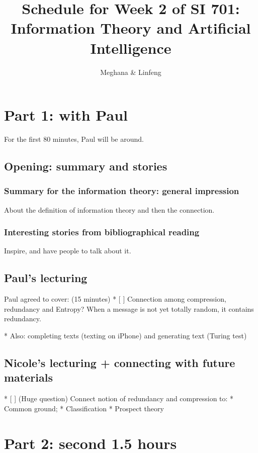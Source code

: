 \documentclass[a4paper]{article}
\title{Schedule for Week 2 of SI 701: Information Theory and Artificial
Intelligence}
\author{Meghana \& Linfeng }
\begin{document}
\maketitle
\section{Part 1: with Paul}
For the first 80 minutes, Paul will be around.

\subsection{Opening: summary and stories}

\subsubsection{Summary for the information theory: general impression}
About the definition of information theory and then the connection.

\subsubsection{Interesting stories from bibliographical reading}
Inspire, and have people to talk about it.


\subsection{Paul's lecturing}
Paul agreed to cover: (15 minutes)
* [ ] Connection among compression, redundancy and Entropy?
      When a message is not yet totally random, it contains redundancy.

    * Also: completing texts (texting on iPhone) and generating text (Turing test)

\subsection{Nicole's lecturing + connecting with future materials}
* [ ] (Huge question) Connect notion of redundancy and compression to:
      * Common ground;
      * Classification
      * Prospect theory


\section{Part 2: second 1.5 hours}
\end{document}
